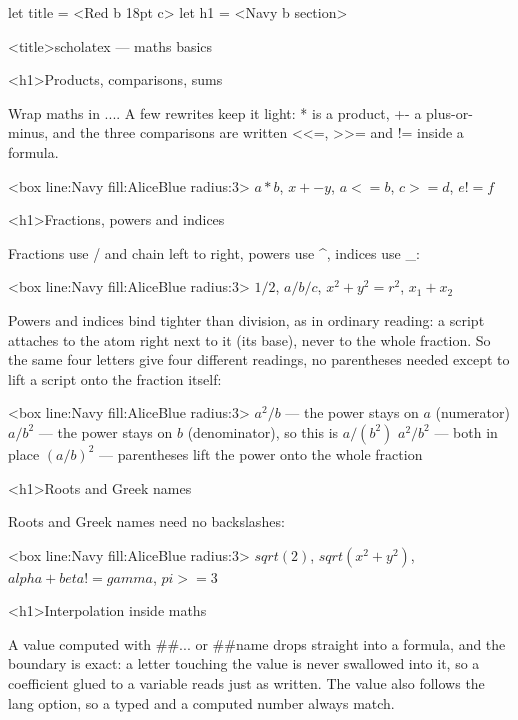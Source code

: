 \documentclass[
  margins=8,
  font=Latin Modern Roman,
  size=12,
  linespread=1.4,
  lang=en
]{scholatex}
\begin{document}
let title = <Red b 18pt c>
let h1    = <Navy b section>

<title>scholatex — maths basics

<h1>Products, comparisons, sums

Wrap maths in $...$. A few rewrites keep it light: * is a
product, +- a plus-or-minus, and the three comparisons are written
<<=, >>= and != inside a formula.

<box line:Navy fill:AliceBlue radius:3>{
	$a * b$, $x +- y$, $a <= b$, $c >= d$, $e != f$
}

<h1>Fractions, powers and indices

Fractions use / and chain left to right, powers use ^,
indices use _:

<box line:Navy fill:AliceBlue radius:3>{
	$1/2$, $a/b/c$, $x^2 + y^2 = r^2$, $x_1 + x_2$
}

Powers and indices bind tighter than division, as in ordinary reading: a
script attaches to the atom right next to it (its base), never to the whole
fraction. So the same four letters give four different readings, no
parentheses needed except to lift a script onto the fraction itself:

<box line:Navy fill:AliceBlue radius:3>{
	$a^2/b$ — the power stays on $a$ (numerator)
	$a/b^2$ — the power stays on $b$ (denominator), so this is $a/(b^2)$
	$a^2/b^2$ — both in place
	$(a/b)^2$ — parentheses lift the power onto the whole fraction
}

<h1>Roots and Greek names

Roots and Greek names need no backslashes:

<box line:Navy fill:AliceBlue radius:3>{
	$sqrt(2)$, $sqrt(x^2 + y^2)$, $alpha + beta != gamma$, $pi >= 3$
}

<h1>Interpolation inside maths

A value computed with ##{{...}} or ##name drops straight into
a formula, and the boundary is exact: a letter touching the value is never
swallowed into it, so a coefficient glued to a variable reads just as written.
The value also follows the lang option, so a typed and a computed
number always match.
\end{document}
